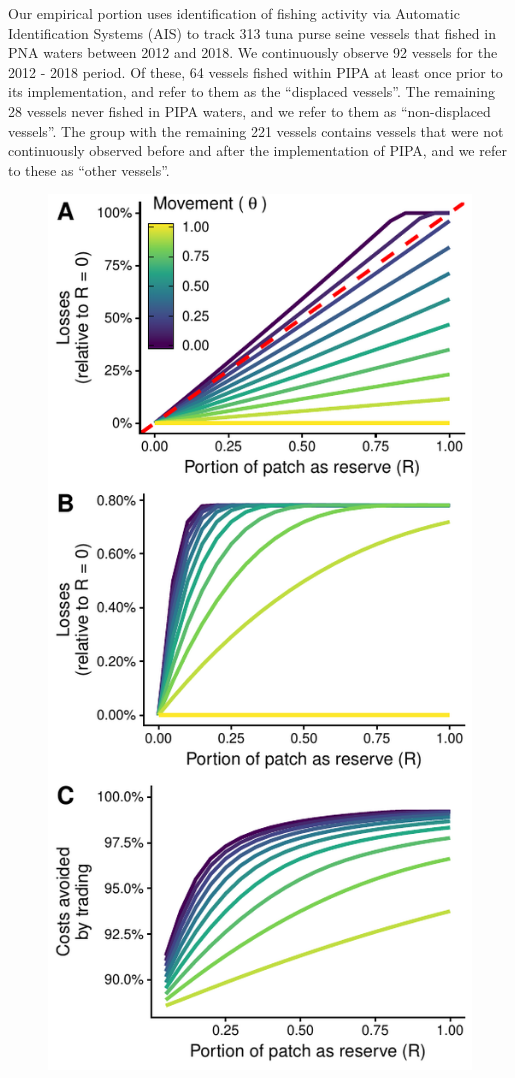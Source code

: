 \documentclass[9p,twocolumn,twoside,lineno]{pnas-new}
\begin{document}
Our empirical portion uses identification of fishing activity via Automatic Identification Systems (AIS) to track 313 tuna purse seine vessels that fished in PNA waters between 2012 and 2018. We continuously observe 92 vessels for the 2012 - 2018 period. Of these, 64 vessels fished within PIPA at least once prior to its implementation, and refer to them as the ``displaced vessels''. The remaining 28 vessels never fished in PIPA waters, and we refer to them as ``non-displaced vessels''. The group with the remaining 221 vessels contains vessels that were not continuously observed before and after the implementation of PIPA, and we refer to these as ``other vessels''.

\begin{figure}[htbp]
\centering
\includegraphics{img/PNA_model.pdf}

\end{figure}
\end{document}
